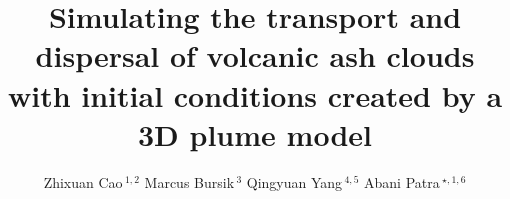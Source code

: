 \documentclass[utf8]{frontiersSCNS} %
\def\firstAuthorLast{Z. Cao {et~al.}} %
\def\Authors{Zhixuan Cao\,$^{1,2}$ Marcus Bursik\,$^{3}$  Qingyuan Yang\,$^{4,5}$ Abani Patra\,$^{\star,1,6}$}
\begin{document}
\onecolumn
{}

\title[VATD Based on 3D Plume Model]{Simulating the transport and dispersal of volcanic ash clouds with initial conditions created by a 3D plume model} 

\author[\firstAuthorLast ]{\Authors} %
\address{} %
\correspondance{} %

\extraAuth{}%


\maketitle
\end{document}
